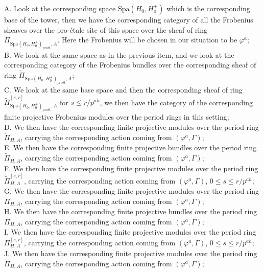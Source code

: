 \documentclass[12pt]{amsart}
\theoremstyle{definition}
\numberwithin{equation}{section}
\begin{document}
\noindent A. Look at the corresponding space $\mathrm{Spa}(H_0,H_0^+)$ which is the corresponding base of the tower, then we have the corresponding category of all the Frobenius sheaves over the pro-\'etale site of this space over the sheaf of ring $\widetilde{\Pi}_{\mathrm{Spa}(H_0,H_0^+)_\text{pro\'et},A}$. Here the Frobenius will be chosen in our situation to be $\varphi^a$;\\
\noindent B. We look at the same space as in the previous item, and we look at the corresponding category of the Frobenius bundles over the corresponding sheaf of ring $\widetilde{\Pi}_{\mathrm{Spa}(H_0,H_0^+)_\text{pro\'et},A}$;\\
\noindent C. We look at the same base space and then the corresponding sheaf of ring $\widetilde{\Pi}^{[s,r]}_{\mathrm{Spa}(H_0,H_0^+)_\text{pro\'et},A}$ for $s\leq r/p^{ah}$, we then have the category of the corresponding finite projective Frobenius modules over the period rings in this setting;\\
\noindent D. We then have the corresponding finite projective modules over the period ring ${\widetilde{\Pi}}_{H,A}$, carrying the corresponding action coming from $(\varphi^a,\Gamma)$;\\
\noindent E. We then have the corresponding finite projective bundles over the period ring ${\widetilde{\Pi}}_{H,A}$, carrying the corresponding action coming from $(\varphi^a,\Gamma)$;\\
\noindent F. We then have the corresponding finite projective modules over the period ring ${\widetilde{\Pi}}^{[s,r]}_{H,A}$, carrying the corresponding action coming from $(\varphi^a,\Gamma)$, $0\leq s\leq r/p^{ah}$;\\
\noindent G. We then have the corresponding finite projective modules over the period ring ${{\Pi}}_{H,A}$, carrying the corresponding action coming from $(\varphi^a,\Gamma)$;\\
\noindent H. We then have the corresponding finite projective bundles over the period ring ${{\Pi}}_{H,A}$, carrying the corresponding action coming from $(\varphi^a,\Gamma)$;\\
\noindent I. We then have the corresponding finite projective modules over the period ring ${{\Pi}}^{[s,r]}_{H,A}$, carrying the corresponding action coming from $(\varphi^a,\Gamma)$, $0\leq s\leq r/p^{ah}$;\\
\noindent J. We then have the corresponding finite projective modules over the period ring ${\breve{\Pi}}_{H,A}$, carrying the corresponding action coming from $(\varphi^a,\Gamma)$;\\
\end{document}
